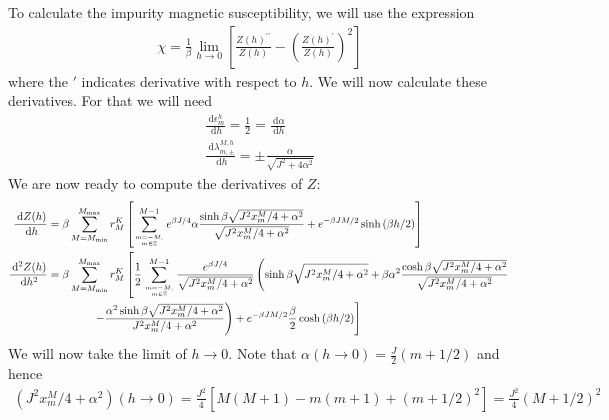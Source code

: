 \documentclass{revtex4-2}
\numberwithin{equation}{section}
\begin{document}
To calculate the impurity magnetic susceptibility, we will use the expression
\begin{equation}\begin{aligned}
	\chi = \frac{1}{\beta}\lim_{h \to 0}\left[\frac{Z(h)^{\prime\prime}}{Z(h)} - \left(\frac{Z(h)^{\prime}}{Z(h)}\right)^2 \right] 
\end{aligned}\end{equation}
where the \(\prime\) indicates derivative with respect to \(h\). We will now calculate these derivatives. For that we will need
\begin{gather}
	\frac{\:\mathrm{d}\epsilon_m^h}{\:\mathrm{d}h} = \frac{1}{2} = \frac{\:\mathrm{d}\alpha}{\:\mathrm{d}h}\\
	\frac{\:\mathrm{d}\lambda_{m,\pm}^{M, h}}{\:\mathrm{d}h} = \pm\frac{\alpha}{\sqrt{J^2 + 4\alpha^2}}
\end{gather}
We are now ready to compute the derivatives of \(Z\):
\begin{equation}\begin{aligned}
	\frac{\:\mathrm{d}Z(h)}{\:\mathrm{d}h} &= \beta\sum_{M=M_\text{min}}^{M_\text{max}}r^K_M\left[\sum_{m=-M, \atop{m\in \mathbb{Z}}}^{M-1}e^{\beta J/4}\alpha\frac{\sinh \beta\sqrt{J^2x^M_m/4 + \alpha^2} }{\sqrt{J^2x^M_m/4 + \alpha^2}} + e^{-\beta JM/2}\sinh \left(\beta h/2\right)\right] \\
	\frac{\:\mathrm{d}^2Z(h)}{\:\mathrm{d}h^2} &= \beta\sum_{M=M_\text{min}}^{M_\text{max}}r^K_M\left[\frac{1}{2}\sum_{m=-M, \atop{m\in \mathbb{Z}}}^{M-1}\frac{e^{\beta J/4}}{\sqrt{J^2x^M_m/4 + \alpha^2}}\left(\sinh \beta\sqrt{J^2x^M_m/4 + \alpha^2} + \beta\alpha^2 \frac{\cosh\beta\sqrt{J^2x^M_m/4 + \alpha^2}}{\sqrt{J^2x^M_m/4 + \alpha^2}}\right.\right.\\
						   &\quad \quad\quad \quad\left.\left. - \frac{\alpha^2 \sinh \beta\sqrt{J^2x^M_m/4 + \alpha^2}}{J^2x^M_m/4 + \alpha^2}\right) + e^{-\beta JM/2}\frac{\beta}{2}\cosh \left(\beta h/2\right)\right] \\
\end{aligned}\end{equation}
We will now take the limit of \(h \to 0\). Note that \(\alpha(h\to 0)=\frac{J}{2}(m+1/2)\) and hence 
\begin{equation}\begin{aligned}
	(J^2x^M_m/4 + \alpha^2)(h \to 0) = \frac{J^2}{4}\left[M(M+1) - m(m+1) + (m+1/2)^2\right] = \frac{J^2}{4}\left( M + 1/2 \right)^2
\end{aligned}\end{equation}
\end{document}
